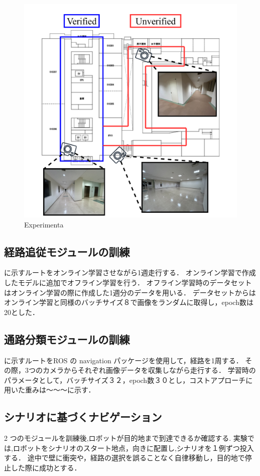 \begin{figure}[htbp]
  \centering
  \includegraphics[width=130mm]{images/pdf/ishiguro/cit3f.pdf}
  \caption{Experimenta}
\end{figure}

\subsection{経路追従モジュールの訓練}
\figref{}に示すルートをオンライン学習させながら1週走行する．
オンライン学習で作成したモデルに追加でオフライン学習を行う．
オフライン学習時のデータセットはオンライン学習の際に作成した1週分のデータを用いる．
データセットからはオンライン学習と同様のバッチサイズ８で画像をランダムに取得し，epoch数は20とした．

\subsection{通路分類モジュールの訓練}
\figref{}に示すルートをROS の navigation パッケージを使用して，経路を1周する．
その際，3つのカメラからそれぞれ画像データを収集しながら走行する．
学習時のパラメータとして，バッチサイズ３２，epoch数３０とし，コストアプローチに用いた重みは～～～に示す．

\subsection{シナリオに基づくナビゲーション}
2 つのモジュールを訓練後,ロボットが目的地まで到達できるか確認する.
実験では,ロボットをシナリオのスタート地点，向きに配置し,シナリオを１例ずつ投入する．
途中で壁に衝突や，経路の選択を誤ることなく自律移動し，目的地で停止した際に成功とする．